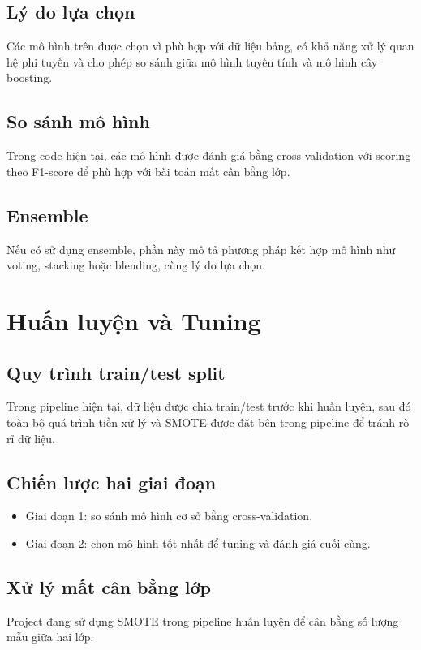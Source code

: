 \documentclass[conference]{IEEEtran}
\begin{document}
\subsection{Lý do lựa chọn}
Các mô hình trên được chọn vì phù hợp với dữ liệu bảng, có khả năng xử lý quan hệ phi tuyến và cho phép so sánh giữa mô hình tuyến tính và mô hình cây boosting.

\subsection{So sánh mô hình}
Trong code hiện tại, các mô hình được đánh giá bằng cross-validation với scoring theo F1-score để phù hợp với bài toán mất cân bằng lớp.

\subsection{Ensemble}
Nếu có sử dụng ensemble, phần này mô tả phương pháp kết hợp mô hình như voting, stacking hoặc blending, cùng lý do lựa chọn.

\section{Huấn luyện và Tuning}
\subsection{Quy trình train/test split}
Trong pipeline hiện tại, dữ liệu được chia train/test trước khi huấn luyện, sau đó toàn bộ quá trình tiền xử lý và SMOTE được đặt bên trong pipeline để tránh rò rỉ dữ liệu.

\subsection{Chiến lược hai giai đoạn}
\begin{itemize}
    \item Giai đoạn 1: so sánh mô hình cơ sở bằng cross-validation.
    \item Giai đoạn 2: chọn mô hình tốt nhất để tuning và đánh giá cuối cùng.
\end{itemize}

\subsection{Xử lý mất cân bằng lớp}
Project đang sử dụng SMOTE trong pipeline huấn luyện để cân bằng số lượng mẫu giữa hai lớp.
\end{document}
